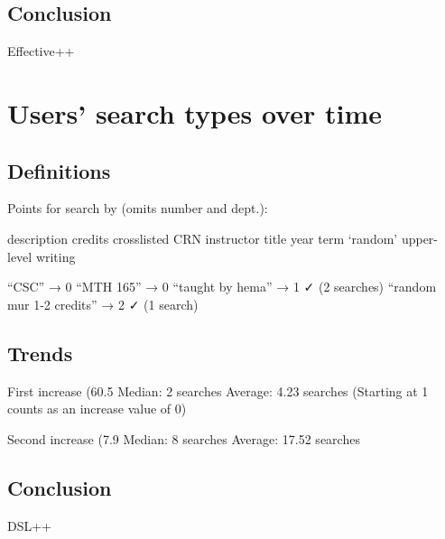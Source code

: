 \subsection{Conclusion}


Effective++

\section{Users' search types over time}

\subsection{Definitions}

Points for search by (omits number and dept.):

description
credits
crosslisted
CRN
instructor
title
year
term
‘random’
upper-level writing

“CSC” → 0
“MTH 165” → 0
“taught by hema” → 1   ✓    (2 searches) 
“random mur 1-2 credits” → 2   ✓    (1 search) 


\subsection{Trends}


First increase (60.5%
Median: 2 searches
Average: 4.23 searches
(Starting at 1 counts as an increase value of 0)

Second increase (7.9%
Median: 8 searches
Average: 17.52 searches

\subsection{Conclusion}

DSL++